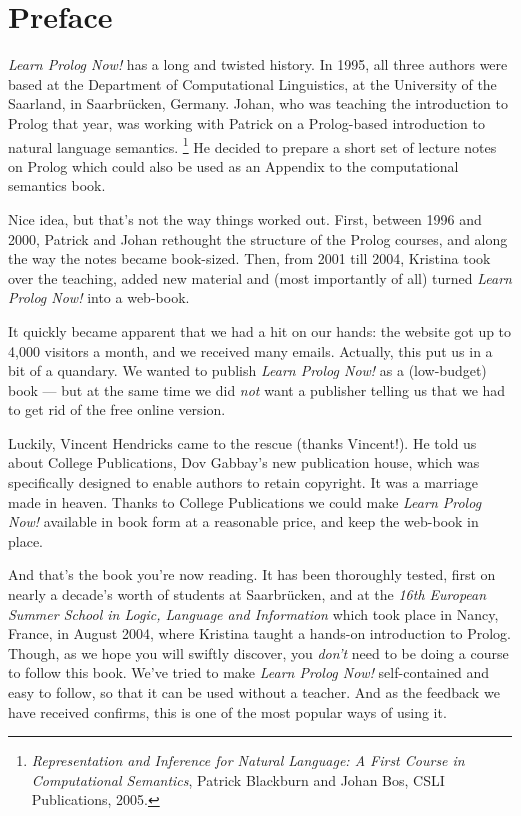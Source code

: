 
\chapter*{Preface}\label{PREFACE}

\textit{Learn Prolog Now!} has a long and twisted history.  In 1995,
all three authors were based at the Department of Computational
Linguistics, at the University of the Saarland, in Saarbr\"{u}cken,
Germany. Johan, who was teaching the introduction to Prolog that year,
was working with Patrick on a Prolog-based introduction to natural
language semantics.%
\footnote{\textit{Representation and Inference for Natural Language: A
First Course in Computational Semantics}, Patrick Blackburn and Johan
Bos, CSLI Publications, 2005.}  
He decided to prepare a short set
of lecture notes on Prolog which could also be used as an Appendix to
the computational semantics book.

Nice idea, but that's not the way things worked out.  First, between
1996 and 2000, Patrick and Johan rethought the structure of the Prolog
courses, and along the way the notes became book-sized.  Then, from
2001 till 2004, Kristina took over the teaching, added new material
and (most importantly of all) turned \textit{Learn Prolog Now!}  into
a web-book.

It quickly became apparent that we had a hit on our hands: the website
got up to 4,000 visitors a month, and we received many
emails. Actually, this put us in a bit of a quandary. We wanted to
publish \textit{Learn Prolog Now!}  as a (low-budget) book --- but at
the same time we did \textit{not} want a publisher telling us that we
had to get rid of the free online version.

Luckily, Vincent Hendricks came to the rescue (thanks Vincent!).  He
told us about College Publications, Dov Gabbay's new publication
house, which was specifically designed to enable authors to retain
copyright. It was a marriage made in heaven.  Thanks to College
Publications we could make \textit{Learn Prolog Now!}  available in
book form at a reasonable price, and keep the web-book in place.

And that's the book you're now reading. It has been thoroughly tested,
first on nearly a decade's worth of students at Saarbr\"{u}cken, and
at the \textit{16th European Summer School in Logic, Language and
Information} which took place in Nancy, France, in August 2004, where
Kristina taught a hands-on introduction to Prolog. Though, as we hope
you will swiftly discover, you \textit{don't} need to be doing a
course to follow this book. We've tried to make \textit{Learn Prolog
Now!}  self-contained and easy to follow, so that it can be used
without a teacher. And as the feedback we have received confirms, this
is one of the most popular ways of using it.

